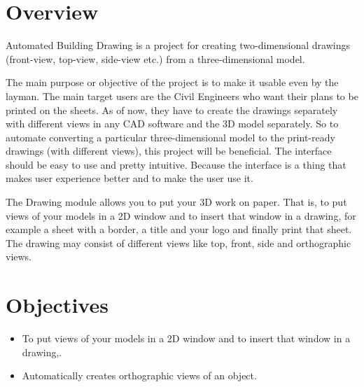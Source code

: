\section{Overview}
\noindent Automated Building Drawing is a project for creating two-dimensional drawings (front-view, top-view, side-view etc.) from a three-dimensional model.

\noindent The main purpose or objective of the project is to make it usable even by the layman. The main target users are the Civil Engineers who want their plans to be printed on the sheets. As of now, they have to create the drawings separately with different views in any CAD software and the 3D model separately. So to automate converting a particular three-dimensional model to the print-ready drawings (with different views), this project will be beneficial. The interface should be easy to use and pretty intuitive. Because the interface is a thing that makes user experience better and to make the user use it.

\noindent The Drawing module allows you to put your 3D work on paper. That is, to put views of your models in a 2D window and to insert that window in a drawing, for example a sheet with a border, a title and your logo and finally print that sheet. The drawing may consist of different views like top, front, side and orthographic views.

\section{Objectives}
\begin{itemize}
\item To put views of your models in a 2D window and to insert that window in a drawing,.
\item Automatically creates orthographic views of an object.
\end{itemize}


